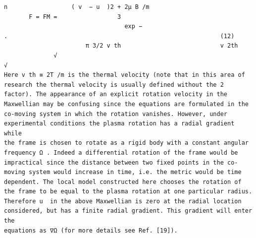 \documentclass[a4paper]{article}
\newcommand{\gkwpagefont}{\fontsize{6.0pt}{7.55pt}\selectfont}
\begin{document}
\begin{Verbatim}[fontsize=\gkwpagefont]
                            n                  ( v  − u  )2 + 2μ B /m
       F = FM =                 3
                                  exp −                                     .                                                            (12)
                       π 3/2 v th                            v 2th
              √                                                                                                                           √
Here v th ≡ 2T /m is the thermal velocity (note that in this area of research the thermal velocity is usually defined without the 2
factor). The appearance of an explicit rotation velocity in the Maxwellian may be confusing since the equations are formulated in the
co-moving system in which the rotation vanishes. However, under experimental conditions the plasma rotation has a radial gradient while
the frame is chosen to rotate as a rigid body with a constant angular frequency Ω . Indeed a differential rotation of the frame would be
impractical since the distance between two fixed points in the co-moving system would increase in time, i.e. the metric would be time
dependent. The local model constructed here chooses the rotation of the frame to be equal to the plasma rotation at one particular radius.
Therefore u  in the above Maxwellian is zero at the radial location considered, but has a finite radial gradient. This gradient will enter the
equations as ∇Ω (for more details see Ref. [19]).
\end{Verbatim}
\newpage
\end{document}
